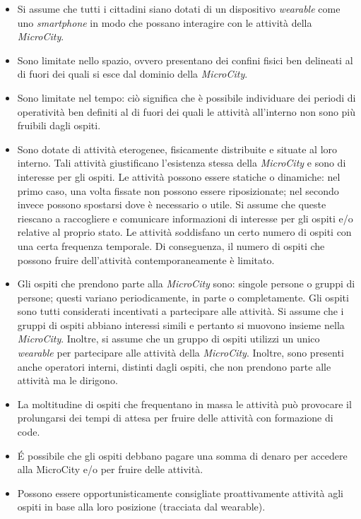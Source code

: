 \begin{itemize}
    \item Si assume che tutti i cittadini siano dotati di un dispositivo \textit{wearable} come uno \textit{smartphone} in modo che possano interagire con le attività della \textit{MicroCity}.
    \item Sono limitate nello spazio, ovvero presentano dei confini fisici ben delineati al di fuori dei quali si esce dal dominio della \textit{MicroCity}.
    \item Sono limitate nel tempo: ciò significa che è possibile individuare dei periodi di operatività ben definiti al di fuori dei quali le attività all'interno non sono più fruibili dagli ospiti.
    \item Sono dotate di attività eterogenee, fisicamente distribuite e situate al loro interno. Tali attività giustificano l'esistenza stessa della \textit{MicroCity} e sono di interesse per gli ospiti. Le attività possono essere statiche o dinamiche: nel primo caso, una volta fissate non possono essere riposizionate; nel secondo invece possono spostarsi dove è necessario o utile. Si assume che queste riescano a raccogliere e comunicare informazioni di interesse per gli ospiti e/o relative al proprio stato.
    Le attività soddisfano un certo numero di ospiti con una certa frequenza temporale. Di conseguenza, il numero di ospiti che possono fruire dell'attività contemporaneamente è limitato.
    \item Gli ospiti che prendono parte alla \textit{MicroCity} sono: singole persone o gruppi di persone; questi variano periodicamente, in parte o completamente. Gli ospiti sono tutti considerati incentivati a partecipare alle attività.
    Si assume che i gruppi di ospiti abbiano interessi simili e pertanto si muovono insieme nella \textit{MicroCity}. Inoltre, si assume che un gruppo di ospiti utilizzi un unico \textit{wearable} per partecipare alle attività della \textit{MicroCity}.
    Inoltre, sono presenti anche operatori interni, distinti dagli ospiti, che non prendono parte alle attività ma le dirigono.
    \item La moltitudine di ospiti che frequentano in massa le attività può provocare il prolungarsi dei tempi di attesa per fruire delle attività con formazione di code.
    \item \'E possibile che gli ospiti debbano pagare una somma di denaro per accedere alla MicroCity e/o per fruire delle attività.
    \item Possono essere opportunisticamente consigliate proattivamente attività agli ospiti in base alla loro posizione (tracciata dal wearable).

\end{itemize}
